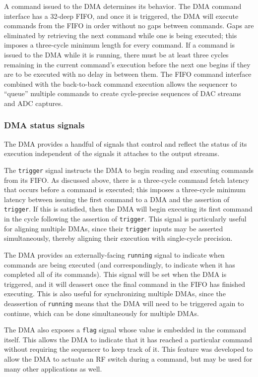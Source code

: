 A command issued to the DMA determines its behavior. The DMA command interface has a 32-deep FIFO, and once it is triggered, the DMA will execute commands from the FIFO in order without no gaps between commands. Gaps are eliminated by retrieving the next command while one is being executed; this imposes a three-cycle minimum length for every command. If a command is issued to the DMA while it is running, there must be at least three cycles remaining in the current command's execution before the next one begins if they are to be executed with no delay in between them. The FIFO command interface combined with the back-to-back command execution allows the sequencer to ``queue'' multiple commands to create cycle-precise sequences of DAC streams and ADC captures.

\subsubsection{DMA status signals}

The DMA provides a handful of signals that control and reflect the status of its execution independent of the signals it attaches to the output streams. 

The \lstinline|trigger| signal instructs the DMA to begin reading and executing commands from its FIFO. As discussed above, there is a three-cycle command fetch latency that occurs before a command is executed; this imposes a three-cycle minimum latency between issuing the first command to a DMA and the assertion of \lstinline|trigger|. If this is satisfied, then the DMA will begin executing its first command in the cycle following the assertion of \lstinline|trigger|. This signal is particularly useful for aligning multiple DMAs, since their \lstinline|trigger| inputs may be asserted simultaneously, thereby aligning their execution with single-cycle precision. 

The DMA provides an externally-facing \lstinline|running| signal to indicate when commands are being executed (and correspondingly, to indicate when it has completed all of its commands). This signal will be set when the DMA is triggered, and it will deassert once the final command in the FIFO has finished executing. This is also useful for synchronizing multiple DMAs, since the deassertion of \lstinline|running| means that the DMA will need to be triggered again to continue, which can be done simultaneously for multiple DMAs.

The DMA also exposes a \lstinline|flag| signal whose value is embedded in the command itself. This allows the DMA to indicate that it has reached a particular command without requiring the sequencer to keep track of it. This feature was developed to allow the DMA to actuate an RF switch during a command, but may be used for many other applications as well.

